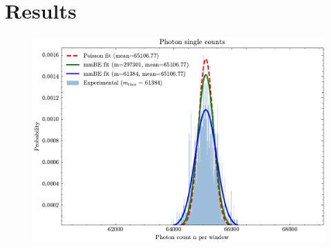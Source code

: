 \section{Results}

\begin{figure}[!h]
	\centering
	\includegraphics[width=.8\linewidth]{Images/mmBE_Test.pdf}
\end{figure}